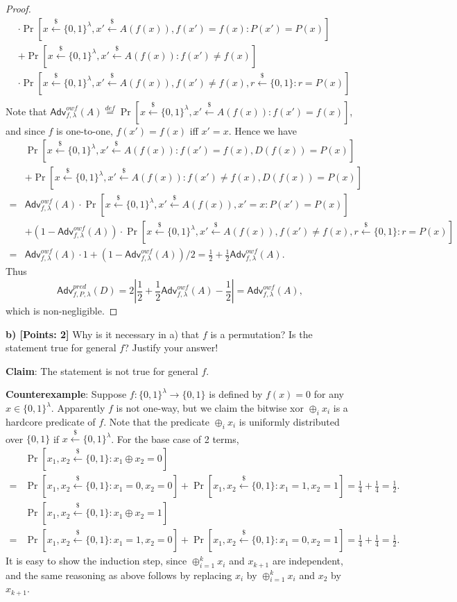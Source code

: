 \documentclass[12pt]{article}
\newcommand{\eqdef}{\stackrel{def}{=}}
\newcommand{\bits}{\{0,1\}}
\newcommand{\getsr}{\stackrel{\$}{\gets}}
\newcommand{\Adv}{\textsf{Adv}}
\theoremstyle{definition}
\begin{document}
\begin{proof}
$$\begin{aligned}
&\cdot\Pr[x\getsr\bits^\lambda, x'\getsr A(f(x)), f(x')=f(x): P(x') = P(x)] \\
&+\Pr[x\getsr\bits^\lambda, x'\getsr A(f(x)) : f(x')\not=f(x)]\\
&\cdot\Pr[x\getsr\bits^\lambda, x'\getsr A(f(x)), f(x')\not=f(x), r\getsr\bits: r = P(x)] \\
\end{aligned}
$$
Note that $\Adv_{f,\lambda}^{owf}(A) \eqdef \Pr[x\getsr\bits^\lambda, x'\getsr A(f(x)) : f(x')=f(x)]$, and since $f$ is one-to-one, $f(x')=f(x)$ iff $x'=x$. Hence we have
$$
\begin{aligned}
&\Pr[x\getsr\bits^\lambda, x'\getsr A(f(x)) : f(x')=f(x), D(f(x)) = P(x)] \\
&+\Pr[x\getsr\bits^\lambda, x'\getsr A(f(x)) : f(x')\not=f(x), D(f(x)) = P(x)] \\
=&\Adv_{f,\lambda}^{owf}(A)\cdot\Pr[x\getsr\bits^\lambda, x'\getsr A(f(x)), x'=x: P(x') = P(x)] \\
&+(1-\Adv_{f,\lambda}^{owf}(A))\cdot\Pr[x\getsr\bits^\lambda, x'\getsr A(f(x)), f(x')\not=f(x), r\getsr\bits: r = P(x)] \\
=&\Adv_{f,\lambda}^{owf}(A)\cdot 1 + (1-\Adv_{f,\lambda}^{owf}(A))/2 = \frac{1}{2} + \frac{1}{2}\Adv_{f,\lambda}^{owf}(A).
\end{aligned}
$$
Thus
$$\Adv_{f,P,\lambda}^{pred}(D) = 2\left| \frac{1}{2} + \frac{1}{2}\Adv_{f,\lambda}^{owf}(A)-\frac{1}{2} \right| = \Adv_{f,\lambda}^{owf}(A),$$
which is non-negligible.
\end{proof}

{\bf b) [Points: 2]} Why is it necessary in a) that $f$ is a permutation? Is the statement true for
general $f$? Justify your answer!

{\bf Claim}: The statement is not true for general $f$.

{\bf Counterexample}: Suppose $f : \bits^\lambda \to \bits$ is defined by $f(x) = 0$ for any $x\in\bits^\lambda$. Apparently $f$ is not one-way, but we claim the bitwise xor $\oplus_i x_i$ is a hardcore predicate of $f$. Note that the predicate $\oplus_i x_i$ is uniformly distributed over $\bits$ if $x\getsr\bits^\lambda$. For the base case of 2 terms, 
$$\begin{aligned}
&\Pr[x_1,x_2\getsr\bits: x_1\oplus x_2 = 0] \\
= &\Pr[x_1,x_2\getsr\bits: x_1 = 0, x_2=0] + \Pr[x_1,x_2\getsr\bits: x_1 = 1, x_2=1] = \frac{1}{4} + \frac{1}{4} = \frac{1}{2}.
\end{aligned}$$ 
$$\begin{aligned}
&\Pr[x_1,x_2\getsr\bits: x_1\oplus x_2 = 1] \\
= &\Pr[x_1,x_2\getsr\bits: x_1 = 1, x_2=0] + \Pr[x_1,x_2\getsr\bits: x_1 = 0, x_2=1] = \frac{1}{4} + \frac{1}{4} = \frac{1}{2}.
\end{aligned}$$ 
It is easy to show the induction step, since $\oplus_{i=1}^k x_i$ and $x_{k+1}$ are independent, and the same reasoning as above follows by replacing $x_i$ by $\oplus_{i=1}^k x_i$ and $x_2$ by $x_{k+1}$.
\end{document}
